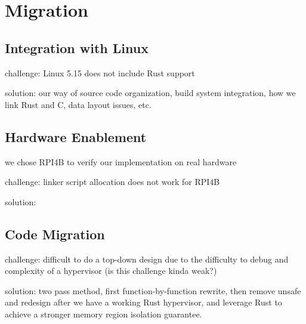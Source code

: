 \chapter{\rustsec{} Migration}

\section{Integration with Linux}

challenge: Linux 5.15 does not include Rust support

solution: our way of source code organization, build system integration,
how we link Rust and C, data layout issues, etc.

\section{Hardware Enablement}

we chose RPI4B to verify our implementation on real hardware

challenge: linker script allocation does not work for RPI4B

solution: 

\section{Code Migration}

challenge: difficult to do a top-down design due to the difficulty to debug
and complexity of a hypervisor (is this challenge kinda weak?)

solution: two pass method, first function-by-function rewrite, then remove
unsafe and redesign after we have a working Rust hypervisor, and leverage
Rust to achieve a stronger memory region isolation guarantee.

